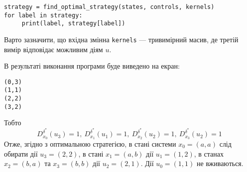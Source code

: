 \documentclass[oneside,14pt]{extarticle}
\begin{document}
\begin{example}
\begin{lstlisting}
strategy = find_optimal_strategy(states, controls, kernels)
for label in strategy:
     print(label, strategy[label])
\end{lstlisting}

Варто зазначити, що вхідна змінна \texttt{kernels} — тривимірний масив, де третій вимір відповідає можливим діям \(u\).

В результаті виконання програми буде виведено на екран:
\begin{verbatim}
(0,3)
(1,1)
(2,2)
(3,2)
\end{verbatim}
Тобто
\[D_{x_0}^{\delta^{*}}(u_3) = 1,\ D_{x_1}^{\delta^*}(u_1) = 1,\ D_{x_2}^{\delta^*}(u_2) = 1,\ D_{x_3}^{\delta^*}(u_2) = 1 \]
Отже, згідно з оптимальною стратегією, в стані системи \(x_0 = (a, a)\) слід обирати дії \(u_3 = (2, 2)\), в стані \(x_1 = (a, b)\) дії \(u_1 = (1, 2)\), в станах \(x_2 = (b, a)\) та \(x_3 = (b, b)\) дії \(u_2 = (2, 1)\). Дії \(u_0 = (1, 1)\) не вживаються. \end{example}



\clearpage


\nocite{David:1998}
\nocite{Knopov:2011}
\nocite{Knopov:1998}
\nocite{Chornei:2005}
\nocite{Koller:2009}



\end{document}
